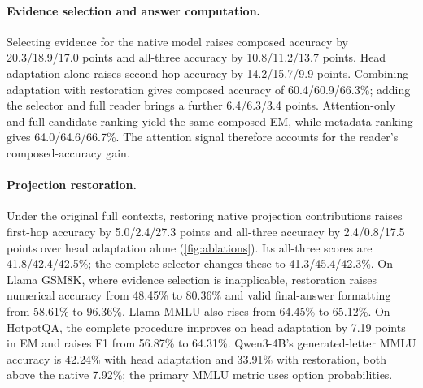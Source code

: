 \paragraph{Evidence selection and answer computation.} Selecting evidence for the native model raises composed accuracy by 20.3/18.9/17.0 points and all-three accuracy by 10.8/11.2/13.7 points. Head adaptation alone raises second-hop accuracy by 14.2/15.7/9.9 points. Combining adaptation with restoration gives composed accuracy of 60.4/60.9/66.3\%; adding the selector and full reader brings a further 6.4/6.3/3.4 points. Attention-only and full candidate ranking yield the same composed EM, while metadata ranking gives 64.0/64.6/66.7\%. The attention signal therefore accounts for the reader's composed-accuracy gain.

\paragraph{Projection restoration.} Under the original full contexts, restoring native projection contributions raises first-hop accuracy by 5.0/2.4/27.3 points and all-three accuracy by 2.4/0.8/17.5 points over head adaptation alone (\cref{fig:ablations}). Its all-three scores are 41.8/42.4/42.5\%; the complete selector changes these to 41.3/45.4/42.3\%. On Llama GSM8K, where evidence selection is inapplicable, restoration raises numerical accuracy from 48.45\% to 80.36\% and valid final-answer formatting from 58.61\% to 96.36\%. Llama MMLU also rises from 64.45\% to 65.12\%. On HotpotQA, the complete procedure improves on head adaptation by 7.19 points in EM and raises F1 from 56.87\% to 64.31\%. Qwen3-4B's generated-letter MMLU accuracy is 42.24\% with head adaptation and 33.91\% with restoration, both above the native 7.92\%; the primary MMLU metric uses option probabilities.

\begin{table}[!htbp]
  \centering
  \caption{\textbf{Component interventions in CoReTrace.} Completed composed-answer EM (\%) on the same 1,000 sources, mean $\pm$ sample SD. Checkmarks indicate enabled operations; adapted configurations share one trained checkpoint. Candidate ranking uses paragraph order or the indicated training-fitted features; ``Full'' combines attention and metadata. The method-family heading applies to every head-adapted row; Full denotes the deployed reader configuration. Bold indicates the highest EM, including ties. Constituent and joint effects are explained above and in \cref{fig:ablations}.}
  \label{tab:component_ablation}
  \small\setlength{\tabcolsep}{3pt}
  
\end{table}

